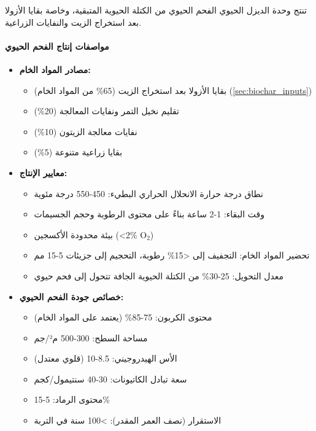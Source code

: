 تنتج وحدة الديزل الحيوي الفحم الحيوي من الكتلة الحيوية المتبقية، وخاصة بقايا الأزولا بعد استخراج الزيت والنفايات الزراعية.

\paragraph{مواصفات إنتاج الفحم الحيوي}
\begin{itemize}
    \item \textbf{مصادر المواد الخام:}
    \begin{itemize}
        \item بقايا الأزولا بعد استخراج الزيت (65\% من المواد الخام) (\ref{sec:biochar_inputs})
        \item تقليم نخيل التمر ونفايات المعالجة (20\%)
        \item نفايات معالجة الزيتون (10\%)
        \item بقايا زراعية متنوعة (5\%)
    \end{itemize}
    
    \item \textbf{معايير الإنتاج:}
    \begin{itemize}
        \item نطاق درجة حرارة الانحلال الحراري البطيء: 450-550 درجة مئوية
        \item وقت البقاء: 1-2 ساعة بناءً على محتوى الرطوبة وحجم الجسيمات
        \item بيئة محدودة الأكسجين (<2\% O$_2$)
        \item تحضير المواد الخام: التجفيف إلى <15\% رطوبة، التحجيم إلى جزيئات 5-15 مم
        \item معدل التحويل: 25-30\% من الكتلة الحيوية الجافة تتحول إلى فحم حيوي
    \end{itemize}
    
    \item \textbf{خصائص جودة الفحم الحيوي:}
    \begin{itemize}
        \item محتوى الكربون: 75-85\% (يعتمد على المواد الخام)
        \item مساحة السطح: 300-500 م²/جم
        \item الأس الهيدروجيني: 8.5-10 (قلوي معتدل)
        \item سعة تبادل الكاتيونات: 30-40 سنتيمول/كجم
        \item محتوى الرماد: 5-15\%
        \item الاستقرار (نصف العمر المقدر): >100 سنة في التربة
    \end{itemize}
\end{itemize}

